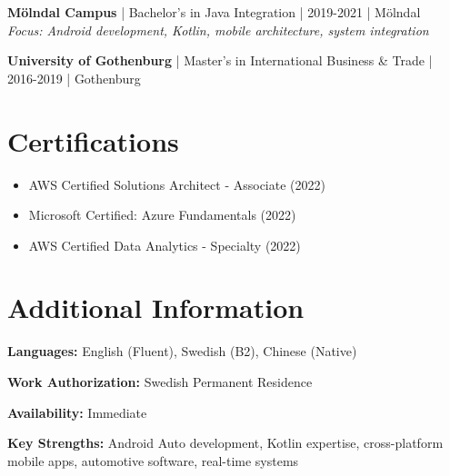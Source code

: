 \documentclass[11pt,a4paper]{article}
\begin{document}
\textbf{Mölndal Campus} | Bachelor's in Java Integration | 2019-2021 | Mölndal\\
\textit{Focus: Android development, Kotlin, mobile architecture, system integration}

\textbf{University of Gothenburg} | Master's in International Business \& Trade | 2016-2019 | Gothenburg

\section*{Certifications}

\begin{itemize}[leftmargin=*, itemsep=2pt]
\item AWS Certified Solutions Architect - Associate (2022)
\item Microsoft Certified: Azure Fundamentals (2022)
\item AWS Certified Data Analytics - Specialty (2022)
\end{itemize}

\section*{Additional Information}

\textbf{Languages:} English (Fluent), Swedish (B2), Chinese (Native)

\textbf{Work Authorization:} Swedish Permanent Residence

\textbf{Availability:} Immediate

\textbf{Key Strengths:} Android Auto development, Kotlin expertise, cross-platform mobile apps, automotive software, real-time systems
\end{document}
